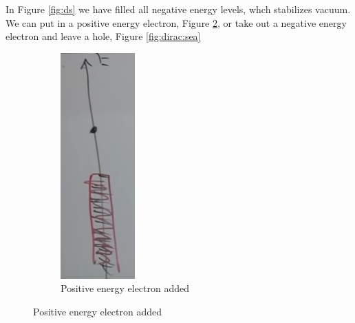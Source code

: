 \documentclass[]{article}
\begin{document}
In Figure \ref{fig:ds} we have filled all negative energy levels, whch stabilizes vacuum. We can put in a positive energy electron, Figure \ref{fig:aqm-10-dirac-sea}, or take out a negative energy electron and leave a hole, Figure \ref{fig:dirac:sea}
\begin{figure}[H]
	\begin{center}
		\caption{The Dirac Sea}\label{fig:ds}
		\begin{subfigure}[t]{0.3\textwidth}
			\begin{center}
				\caption{Positive energy electron added}\label{fig:aqm-10-dirac-sea}
				\includegraphics[width=\textwidth]{aqm-10-dirac-sea}

\end{center}
\end{subfigure}
\end{center}
\end{figure}
\end{document}
